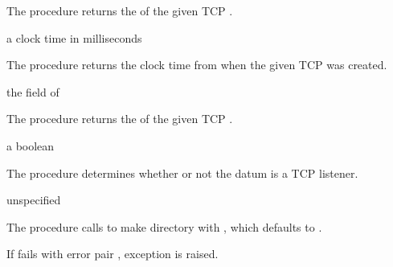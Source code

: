 The  procedure returns the  of
the given TCP .

\begin{procedure}
\end{procedure}
\returns{} a clock time in milliseconds

The  procedure returns the clock time from
 when the given TCP  was created.

\begin{procedure}
\end{procedure}
\returns{} the  field of 

The  procedure returns the
 of the given TCP .

\begin{procedure}
\end{procedure}
\returns{} a boolean

The  procedure determines whether or not the datum
 is a TCP listener.

\begin{procedure}
\end{procedure}
\returns{} unspecified

The  procedure calls 
to make directory  with , which defaults to
.

If  fails with error pair , exception  is raised.

\begin{procedure}
\end{procedure}
\returns{} 

